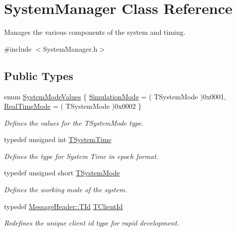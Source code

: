 \hypertarget{class_system_manager}{\section{System\-Manager Class Reference}
\label{class_system_manager}
}


Manages the various components of the system and timing.  




{\ttfamily \#include $<$System\-Manager.\-h$>$}

\subsection*{Public Types}
\begin{DoxyCompactItemize}
\item 
enum \hyperlink{class_system_manager_a073873362e7861f8a0368bb62144d4ca}{System\-Mode\-Values} \{ \hyperlink{class_system_manager_a073873362e7861f8a0368bb62144d4caa55cdecfd6754c9496bbe9560aa6f181e}{Simulation\-Mode} = ( T\-System\-Mode )0x0001, 
\hyperlink{class_system_manager_a073873362e7861f8a0368bb62144d4caac1092623b7154136da8721ebf7402357}{Real\-Time\-Mode} = ( T\-System\-Mode )0x0002
 \}
\begin{DoxyCompactList}\small\item\em Defines the values for the T\-System\-Mode type. \end{DoxyCompactList}\item 
typedef unsigned int \hyperlink{class_system_manager_a9743ff4f23e7d957f5932780d8070099}{T\-System\-Time}
\begin{DoxyCompactList}\small\item\em Defines the type for System Time in epoch format. \end{DoxyCompactList}\item 
typedef unsigned short \hyperlink{class_system_manager_aa32b3f50b8882c8aa7a9ca88ab7a43dd}{T\-System\-Mode}
\begin{DoxyCompactList}\small\item\em Defines the working mode of the system. \end{DoxyCompactList}\item 
typedef \hyperlink{class_terra_swarm_1_1_message_header_ab55de822fadad758edcd8f36bd07676e}{Message\-Header\-::\-T\-Id} \hyperlink{class_system_manager_af957fc0ff78c4c38085c26ac0d81064e}{T\-Client\-Id}
\begin{DoxyCompactList}\small\item\em Redefines the unique client id type for rapid development. \end{DoxyCompactList}\item 

\end{DoxyCompactItemize}
